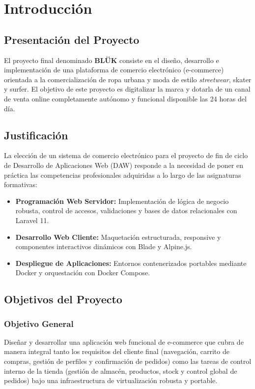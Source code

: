 \chapter{Introducción}

\section{Presentación del Proyecto}
El proyecto final denominado \textbf{BLÜK} consiste en el diseño, desarrollo e implementación de una plataforma de comercio electrónico (e-commerce) orientada a la comercialización de ropa urbana y moda de estilo \textit{streetwear}, skater y surfer. El objetivo de este proyecto es digitalizar la marca y dotarla de un canal de venta online completamente autónomo y funcional disponible las 24 horas del día.

\section{Justificación}
La elección de un sistema de comercio electrónico para el proyecto de fin de ciclo de Desarrollo de Aplicaciones Web (DAW) responde a la necesidad de poner en práctica las competencias profesionales adquiridas a lo largo de las asignaturas formativas:
\begin{itemize}
    \item \textbf{Programación Web Servidor:} Implementación de lógica de negocio robusta, control de accesos, validaciones y bases de datos relacionales con Laravel 11.
    \item \textbf{Desarrollo Web Cliente:} Maquetación estructurada, responsive y componentes interactivos dinámicos con Blade y Alpine.js.
    \item \textbf{Despliegue de Aplicaciones:} Entornos contenerizados portables mediante Docker y orquestación con Docker Compose.
\end{itemize}

\section{Objetivos del Proyecto}

\subsection{Objetivo General}
Diseñar y desarrollar una aplicación web funcional de e-commerce que cubra de manera integral tanto los requisitos del cliente final (navegación, carrito de compras, gestión de perfiles y confirmación de pedidos) como las tareas de control interno de la tienda (gestión de almacén, productos, stock y control global de pedidos) bajo una infraestructura de virtualización robusta y portable.

